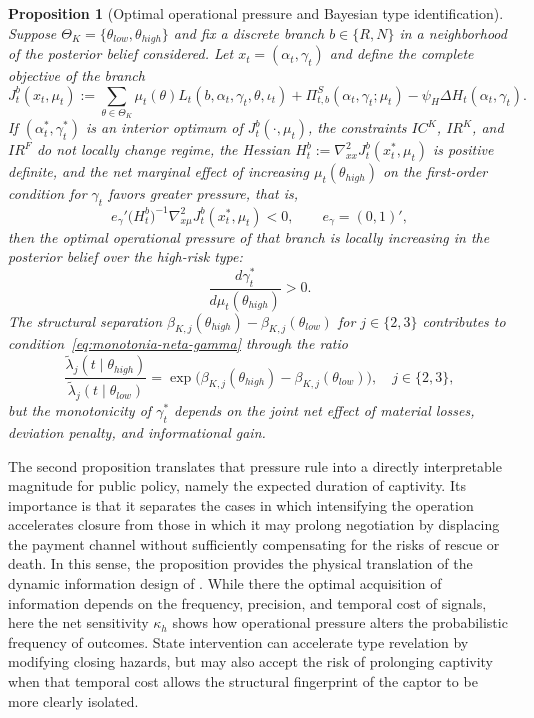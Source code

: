 \documentclass[review,authoryear,12pt]{elsarticle}
\theoremstyle{plain}
\newtheorem{proposition}[theorem]{Proposition}
\theoremstyle{definition}
\newcommand{\ThetaK}{\Theta_K}
\newcommand{\1}{\mathbf{1}}
\begin{document}
\begin{proposition}[Optimal operational pressure and Bayesian type identification]
\label{prop:optimal-gamma-beliefs}
Suppose $\ThetaK=\{\theta_{low},\theta_{high}\}$ and fix a discrete branch $b\in\{R,N\}$ in a neighborhood of the posterior belief considered. Let $x_t=(\alpha_t,\gamma_t)$ and define the complete objective of the branch
\begin{equation}
\label{eq:obj-rama-completo}
J_t^b(x_t,\mu_t)
:=
\sum_{\theta\in\ThetaK}\mu_t(\theta)L_t(b,\alpha_t,\gamma_t,\theta,\iota_t)
+\Pi_{t,b}^{S}(\alpha_t,\gamma_t;\mu_t)
-\psi_H\Delta H_t(\alpha_t,\gamma_t).
\end{equation}
If $(\alpha_t^\ast,\gamma_t^\ast)$ is an interior optimum of $J_t^b(\cdot,\mu_t)$, the constraints $IC^K$, $IR^K$, and $IR^F$ do not locally change regime, the Hessian $H_t^b:=\nabla_{xx}^2J_t^b(x_t^\ast,\mu_t)$ is positive definite, and the net marginal effect of increasing $\mu_t(\theta_{high})$ on the first-order condition for $\gamma_t$ favors greater pressure, that is,
\begin{equation}
\label{eq:monotonia-neta-gamma}
e_\gamma'
\bigl(H_t^b\bigr)^{-1}
\nabla_{x\mu}^2J_t^b(x_t^\ast,\mu_t)
<0,
\qquad
e_\gamma=(0,1)',
\end{equation}
then the optimal operational pressure of that branch is locally increasing in the posterior belief over the high-risk type:
\[
\frac{d\gamma_t^\ast}{d\mu_t(\theta_{high})} > 0.
\]
The structural separation $\beta_{K,j}(\theta_{high})-\beta_{K,j}(\theta_{low})$ for $j\in\{2,3\}$ contributes to condition~\eqref{eq:monotonia-neta-gamma} through the ratio
\[
\frac{\tilde\lambda_j(t\mid\theta_{high})}{\tilde\lambda_j(t\mid\theta_{low})}
=\exp\!\bigl(\beta_{K,j}(\theta_{high})-\beta_{K,j}(\theta_{low})\bigr),
\quad j\in\{2,3\},
\]
but the monotonicity of $\gamma_t^\ast$ depends on the joint net effect of material losses, deviation penalty, and informational gain.
\end{proposition}

\noindent The second proposition translates that pressure rule into a directly interpretable magnitude for public policy, namely the expected duration of captivity. Its importance is that it separates the cases in which intensifying the operation accelerates closure from those in which it may prolong negotiation by displacing the payment channel without sufficiently compensating for the risks of rescue or death. In this sense, the proposition provides the physical translation of the dynamic information design of \citet{Zhong2022}. While there the optimal acquisition of information depends on the frequency, precision, and temporal cost of signals, here the net sensitivity $\kappa_h$ shows how operational pressure alters the probabilistic frequency of outcomes. State intervention can accelerate type revelation by modifying closing hazards, but may also accept the risk of prolonging captivity when that temporal cost allows the structural fingerprint of the captor to be more clearly isolated.
\end{document}
